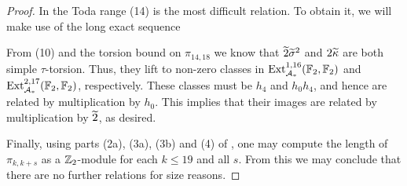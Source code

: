 \begin{proof}
  In the Toda range (14) is the most difficult relation.
  To obtain it, we will make use of the long exact sequence
  \begin{center}
  \end{center}
  From (10) and the torsion bound on $\pi_{14,18}$ we know that $\wt{2} \wt{\sigma}^2$ and $2 \wt{\kappa}$ are both simple $\tau$-torsion. Thus, they lift to non-zero classes in $\operatorname{\mathrm{Ext}}^{1,16} _{\operatorname{\mathcal{A}}_*} (\operatorname{\mathbb{F}}_2, \operatorname{\mathbb{F}}_2)$ and $\operatorname{\mathrm{Ext}}^{2,17} _{\operatorname{\mathcal{A}}_*} (\operatorname{\mathbb{F}}_2, \operatorname{\mathbb{F}}_2)$, respectively. These classes must be $h_4$ and $h_0 h_4$, and hence are related by multiplication by $h_0$.
	This implies that their images are related by multiplication by $\wt{2}$, as desired.

    Finally, using parts (2a), (3a), (3b) and (4) of , one may compute the length of $\pi_{k,k+s}$ as a $\mathbb{Z}_2$-module for each $k \leq 19$ and all $s$. From this we may conclude that there are no further relations for size reasons.
\end{proof}


